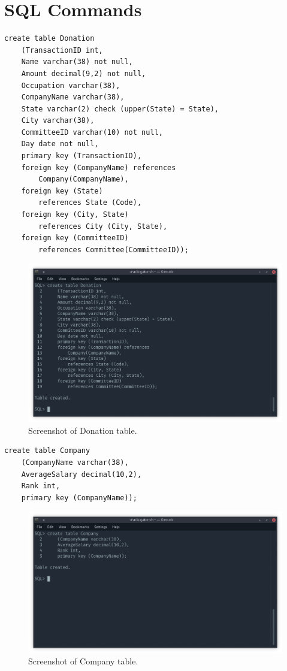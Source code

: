 \documentclass[12pt]{article}
\begin{document}
\section{SQL Commands}
\begin{verbatim}
create table Donation
    (TransactionID int,
    Name varchar(38) not null,
    Amount decimal(9,2) not null,
    Occupation varchar(38),
    CompanyName varchar(38),
    State varchar(2) check (upper(State) = State),
    City varchar(38),
    CommitteeID varchar(10) not null,
    Day date not null,
    primary key (TransactionID),
    foreign key (CompanyName) references
        Company(CompanyName),
    foreign key (State) 
        references State (Code),
    foreign key (City, State)
        references City (City, State),
    foreign key (CommitteeID) 
        references Committee(CommitteeID));
\end{verbatim}
    \begin{figure}[H]
        \begin{center}
        \includegraphics[scale=.40]{donation}
        \caption{Screenshot of Donation table.}
        \label{fig:donation}
        \end{center}
    \end{figure}
\begin{verbatim}
create table Company
    (CompanyName varchar(38),
    AverageSalary decimal(10,2),
    Rank int,
    primary key (CompanyName));
\end{verbatim}
    \begin{figure}[H]
        \begin{center}
        \includegraphics[scale=.40]{company}
        \caption{Screenshot of Company table.}
        \label{fig:company}
        \end{center}
    \end{figure}
\end{document}
